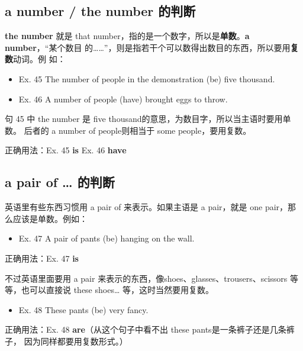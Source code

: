 \documentclass{yufa}
\begin{document}
\subsection{a number / the number 的判断}

\textbf{the number} 就是 that number，指的是一个数字，所以是\textbf{单数}。\textbf{a number}，“某个数目
的\ldots\ldots{}”，则是指若干个可以数得出数目的东西，所以要用\textbf{复数}动词。例
如：
\begin{mybox}

\begin{itemize}
\item   Ex. 45 The number of people in the demonstration (be) five thousand.
\item   Ex. 46 A number of people (have) brought eggs to throw.
\end{itemize}

句 45 中 the number 是 five thousand的意思，为数目字，所以当主语时要用单数。
后者的 a number of people则相当于 some people，要用复数。

\tcblower

正确用法：Ex. 45 \textbf{is} \qquad\quad Ex. 46 \textbf{have}
\end{mybox}

\subsection{a pair of \ldots{} 的判断}

英语里有些东西习惯用 a pair of 来表示。如果主语是 a pair，就是 one
pair，那么应该是单数。例如：

\begin{mybox}

\begin{itemize}
\item   Ex. 47 A pair of pants (be) hanging on the wall.
\end{itemize}

\tcblower

正确用法：Ex. 47 \textbf{is}
\end{mybox}

不过英语里面要用 a pair 来表示的东西，像shoes、glasses、trousers、scissors 等
等，也可以直接说 these shoes\ldots{} 等，这时当然要用复数。

\begin{mybox}
\begin{itemize}
\item   Ex. 48 These pants (be) very fancy.
\end{itemize}

\tcblower

正确用法：Ex. 48 \textbf{are}（从这个句子中看不出 these pants是一条裤子还是几条裤子，
因为同样都要用复数形式。）
\end{mybox}
\end{document}

